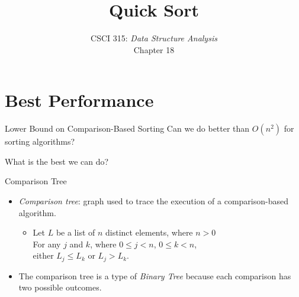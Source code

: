 \documentclass[14pt,aspectratio=1610]{beamer}
\title{\Huge{} Quick Sort}
\subtitle{CSCI 315: \textit{Data Structure Analysis}\\Chapter 18}
\institute{Charleston Southern University}
\begin{document}
\begin{frame}
  \titlepage%
\end{frame}

\section{Best Performance}

\begin{frame}{Lower Bound on Comparison-Based Sorting}
\center\Large
Can we do better than \(O(n^2)\) for sorting algorithms?\vspace{1em}

What is the best we can do?
\end{frame}

\begin{frame}{Comparison Tree}
\large
\begin{itemize}\setlength\itemsep{0.5em}
\item
  \emph{Comparison tree}: graph used to trace the execution of a comparison-based algorithm.
  \begin{itemize}
  \item
    Let \(L\) be a list of \(n\) distinct elements, where \(n > 0\) \\
    For any \(j\) and \(k\), where \( 0 \le j < n \),  \( 0 \le k < n \),\\
    either \(L_{j} \le L_{k}\)  or  \(L_{j} > L_{k}\).
  \end{itemize}
\item
  The comparison tree is a type of \emph{Binary Tree} because each comparison
  has two possible outcomes.
\end{itemize}
\end{frame}
\end{document}
